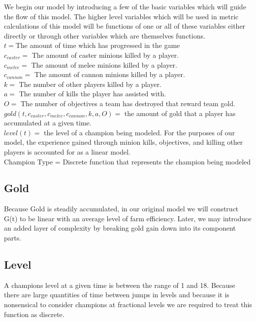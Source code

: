 \documentclass{article}
\begin{document}
We begin our model by introducing a few of the basic variables which will guide the flow of this model.  The higher level variables which will be used in metric calculations of this model will be functions of one or all of these variables either directly or through other variables which are themselves functions.\\
$t 		         = $The amount of time which has progressed in the game\\
$c_{caster} = $ The amount of caster minions killed by a player. \\
$c_{melee} = $ The amount of melee minions killed by a player. \\
$c_{cannon} = $ The amount of cannon minions killed by a player. \\
$k = $ The number of other players killed by a player. \\
$a = $ The number of kills the player has assisted with. \\
$O = $ The number of objectives a team has destroyed that reward team gold. \\
$gold(t, c_{caster}, c_{melee}, c_{cannon}, k, a, O) = $ the amount of gold that a player has accumulated at a given time. \\
$level(t) = $ the level of a champion being modeled. For the purposes of our model, the experience gained through minion kills, objectives, and killing other players is accounted for as a linear model.\\
Champion Type     =  Discrete function that represents the champion being modeled\\
 
\subsection{Gold}
Because Gold is steadily accumulated, in our original model we will construct G(t) to be linear with an average level of farm efficiency.  Later, we may introduce an added layer of complexity by breaking gold gain down into its component parts.

\subsection{Level}  
A champions level at a given time is between the range of 1 and 18.  Because there are large quantities of time between jumps in levels and because it is nonsensical to consider champions at fractional levels we are required to treat this function as discrete. 
\end{document}
